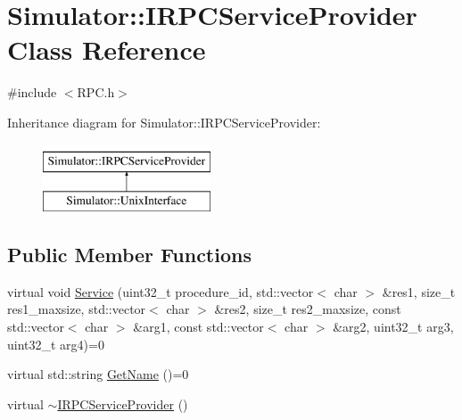 \hypertarget{class_simulator_1_1_i_r_p_c_service_provider}{\section{Simulator\+:\+:I\+R\+P\+C\+Service\+Provider Class Reference}
\label{class_simulator_1_1_i_r_p_c_service_provider}
}


{\ttfamily \#include $<$R\+P\+C.\+h$>$}

Inheritance diagram for Simulator\+:\+:I\+R\+P\+C\+Service\+Provider\+:\begin{figure}[H]
\begin{center}
\leavevmode
\includegraphics[height=2.000000cm]{class_simulator_1_1_i_r_p_c_service_provider}
\end{center}
\end{figure}
\subsection*{Public Member Functions}
\begin{DoxyCompactItemize}
\item 
virtual void \hyperlink{class_simulator_1_1_i_r_p_c_service_provider_aa505319711a84aa58fbf544f31644b6d}{Service} (uint32\+\_\+t procedure\+\_\+id, std\+::vector$<$ char $>$ \&res1, size\+\_\+t res1\+\_\+maxsize, std\+::vector$<$ char $>$ \&res2, size\+\_\+t res2\+\_\+maxsize, const std\+::vector$<$ char $>$ \&arg1, const std\+::vector$<$ char $>$ \&arg2, uint32\+\_\+t arg3, uint32\+\_\+t arg4)=0
\item 
virtual std\+::string \hyperlink{class_simulator_1_1_i_r_p_c_service_provider_acd7dacc6b435c95a6534997420c75a7f}{Get\+Name} ()=0
\item 
virtual \hyperlink{class_simulator_1_1_i_r_p_c_service_provider_a77e9acb1d8ca90dd844ecf0e82efa06a}{$\sim$\+I\+R\+P\+C\+Service\+Provider} ()
\end{DoxyCompactItemize}


